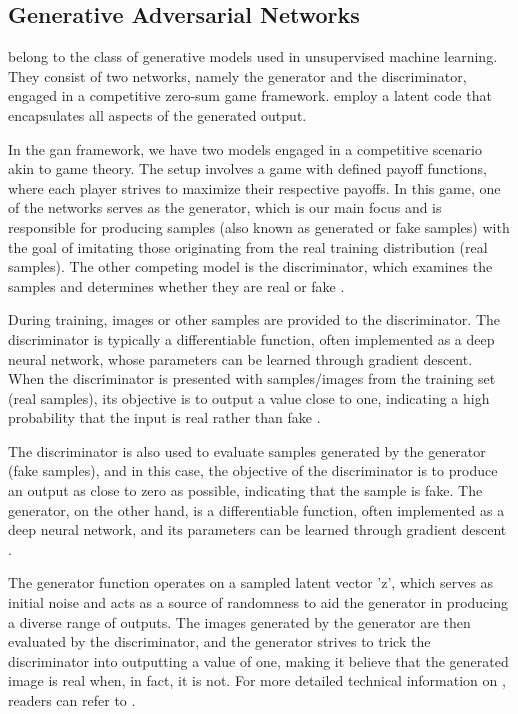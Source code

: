 \documentclass[conference]{IEEEtran}
\begin{document}
\subsection{Generative Adversarial Networks}

 belong to the class of generative models used in unsupervised machine learning. They consist of two networks, namely the generator and the discriminator, engaged in a competitive zero-sum game framework.  employ a latent code that encapsulates all aspects of the generated output.

In the \acrshort{gan} framework, we have two models engaged in a competitive scenario akin to game theory. The setup involves a game with defined payoff functions, where each player strives to maximize their respective payoffs. In this game, one of the networks serves as the generator, which is our main focus and is responsible for producing samples (also known as generated or fake samples) with the goal of imitating those originating from the real training distribution (real samples). The other competing model is the discriminator, which examines the samples and determines whether they are real or fake \cite{gans_overview_2018}.

During training, images or other samples are provided to the discriminator. The discriminator is typically a differentiable function, often implemented as a deep neural network, whose parameters can be learned through gradient descent. When the discriminator is presented with samples/images from the training set (real samples), its objective is to output a value close to one, indicating a high probability that the input is real rather than fake \cite{gans_overview_2018}.

The discriminator is also used to evaluate samples generated by the generator (fake samples), and in this case, the objective of the discriminator is to produce an output as close to zero as possible, indicating that the sample is fake. The generator, on the other hand, is a differentiable function, often implemented as a deep neural network, and its parameters can be learned through gradient descent \cite{gans_overview_2018}.

The generator function operates on a sampled latent vector 'z', which serves as initial noise and acts as a source of randomness to aid the generator in producing a diverse range of outputs. The images generated by the generator are then evaluated by the discriminator, and the generator strives to trick the discriminator into outputting a value of one, making it believe that the generated image is real when, in fact, it is not. For more detailed technical information on , readers can refer to \cite{gans_overview_2018}.
\end{document}
